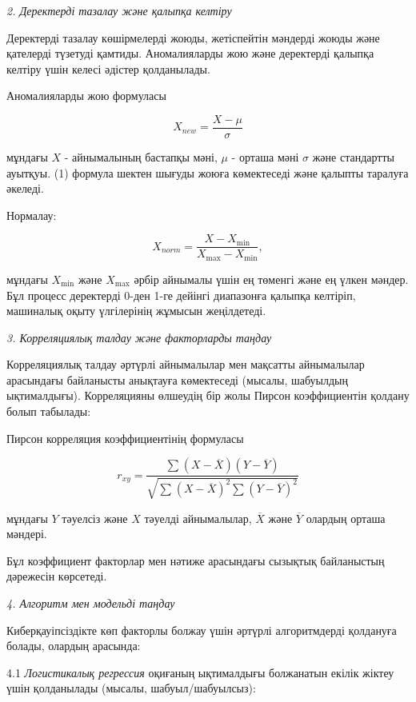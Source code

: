 \emph{2. Деректерді тазалау және қалыпқа келтіру}

Деректерді тазалау көшірмелерді жоюды, жетіспейтін мәндерді жоюды және
қателерді түзетуді қамтиды. Аномалияларды жою және деректерді қалыпқа
келтіру үшін келесі әдістер қолданылады.

Аномалияларды жою формуласы

\begin{equation}
X_{new} = \frac{X - \mu}{\sigma}
\end{equation}

мұндағы \(X\) - айнымалының бастапқы мәні, \(\mu\) - орташа мәні
\(\sigma\) және стандартты ауытқуы. (1) формула шектен шығуды жоюға
көмектеседі және қалыпты таралуға әкеледі.

Нормалау:

\begin{equation}
X_{norm} = \frac{X - X_{\min}}{X_{\max} - X_{\min}},
\end{equation}

мұндағы \(X_{\min}\) және \(X_{\max}\) әрбір айнымалы үшін ең төменгі
және ең үлкен мәндер. Бұл процесс деректерді 0-ден 1-ге дейінгі
диапазонға қалыпқа келтіріп, машиналық оқыту үлгілерінің жұмысын
жеңілдетеді.

\emph{3. Корреляциялық талдау және факторларды таңдау}

Корреляциялық талдау әртүрлі айнымалылар мен мақсатты айнымалылар
арасындағы байланысты анықтауға көмектеседі (мысалы, шабуылдың
ықтималдығы). Корреляцияны өлшеудің бір жолы Пирсон коэффициентін
қолдану болып табылады:

Пирсон корреляция коэффициентінің формуласы

\begin{equation}
r_{xy} = \frac{\sum_{}^{}{(X - \overline{X})(Y - \overline{Y})}}{\sqrt{\sum_{}^{}{{(X - \overline{X})}^{2}\sum_{}^{}{(Y - \overline{Y})}^{2}}}}
\end{equation}

мұндағы \(Y\) тәуелсіз және \(X\) тәуелді айнымалылар, \(\overline{X}\)
және \(\overline{Y}\) олардың орташа мәндері.

Бұл коэффициент факторлар мен нәтиже арасындағы сызықтық байланыстың
дәрежесін көрсетеді.

\emph{4. Алгоритм мен модельді таңдау}

Киберқауіпсіздікте көп факторлы болжау үшін әртүрлі алгоритмдерді
қолдануға болады, олардың арасында:

4.1 \emph{Логистикалық регрессия} оқиғаның ықтималдығы болжанатын екілік
жіктеу үшін қолданылады (мысалы, шабуыл/шабуылсыз):

